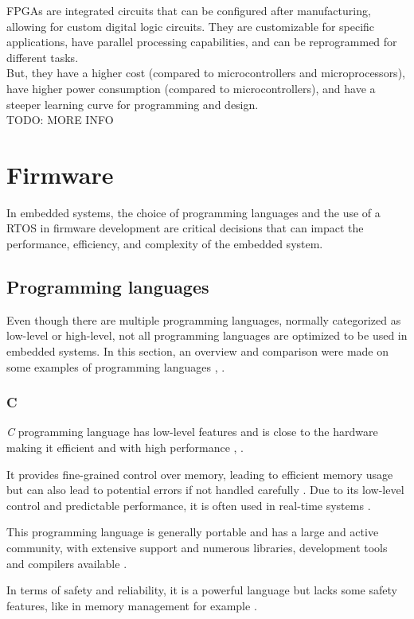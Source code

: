 \glspl{FPGA} are integrated circuits that can be configured after manufacturing, allowing for custom digital logic circuits. 
They are customizable for specific applications, have parallel processing capabilities, and can be reprogrammed for different tasks.\\
But, they have a higher cost (compared to microcontrollers and microprocessors), have higher power consumption (compared to microcontrollers), and have a steeper learning curve for programming and design.\\

TODO: MORE INFO

\section{Firmware}
In embedded systems, the choice of programming languages and the use of a \gls{RTOS} in firmware development are critical decisions that can impact the performance, efficiency, and complexity of the embedded system.

\subsection{Programming languages}
Even though there are multiple programming languages, normally categorized as low-level or high-level, not all programming languages are optimized to be used in embedded systems.
In this section, an overview and comparison were made on some examples of programming languages \cite{LPROG4}, \cite{LPROG6}.

\subsubsection{C}
\textit{C} programming language has low-level features and is close to the hardware making it efficient and with high performance \cite{LPROG2}, \cite{LPROG6}.

It provides fine-grained control over memory, leading to efficient memory usage but can also lead to potential errors if not handled carefully \cite{LPROG5}.
Due to its low-level control and predictable performance, it is often used in real-time systems \cite{LPROG7}.

This programming language is generally portable and has a large and active community, with extensive support and numerous libraries, development tools and compilers available \cite{LPROG7}.

In terms of safety and reliability, it is a powerful language but lacks some safety features, like in memory management for example \cite{LPROG7}.

